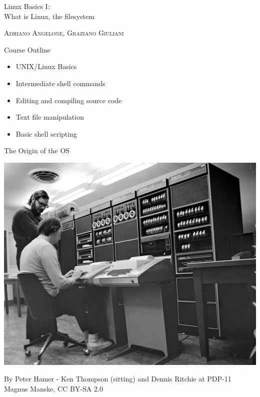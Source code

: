 \documentclass[unknownkeysallowed, 10pt, a4 paper, handout]{beamer}
\begin{document}
\begin{frame}
  \begin{center}


    \begin{block}{}
      \Large
      \centering
      Linux Basics I:\\
      What is Linux, the filesystem
    \end{block}

    \vspace{6mm}
    \large
    \textsc{Adriano Angelone, Graziano Giuliani} \\

  \end{center}
\end{frame}


\begin{frame}[label=outline]{Course Outline}
  \begin{itemize}
    \item UNIX/Linux Basics
    \item Intermediate shell commands
    \item Editing and compiling source code
    \item Text file manipulation
    \item Basic shell scripting
  \end{itemize}
\end{frame}


\begin{frame}[label=pdp11]{The Origin of the OS}
  \begin{center}
    \includegraphics[scale=3.5]{pics/pdp11.jpg}
  \end{center}
  \begin{flushright}
    \tiny{By Peter Hamer - Ken Thompson (sitting) and Dennis Ritchie at
    PDP-11 Magnus Manske, CC BY-SA 2.0}
  \end{flushright}
\end{frame}
\end{document}
